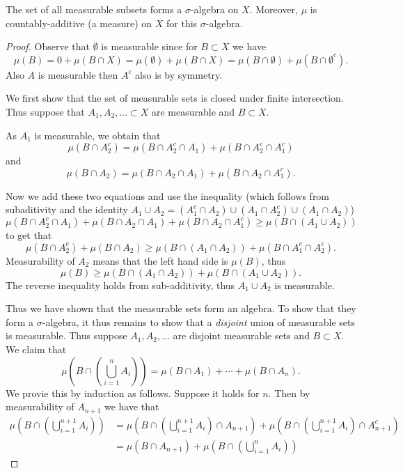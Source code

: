 \documentclass[twoside, a4paper, 10pt]{amsart}
\begin{document}
\begin{thm}\label{thm: mes sets sigma algebra} The set of all measurable subsets forms a $\sigma$-algebra on $X$. Moreover, $\mu$ is countably-additive (a measure) on $X$ for this $\sigma$-algebra.

\end{thm}

\begin{proof} Observe that $\emptyset$ is measurable since for $B \subset X$ we have $$\mu(B) = 0 + \mu(B \cap X) = \mu(\emptyset) + \mu(B \cap X) = \mu(B \cap \emptyset) + \mu(B \cap \emptyset^c).$$ Also $A$ is measurable then $A^c$ also is by symmetry.

We first show that the set of measurable sets is closed under finite intersection. Thus suppose that $A_1, A_2,\ldots \subset X$ are measurable and $B \subset X$.

As $A_1$ is measurable, we obtain that $$\mu(B \cap A_2^c) = \mu(B \cap A_2^c \cap A_1) + \mu(B \cap A_2^c \cap A_1^c)$$ and $$\mu(B \cap A_2) = \mu(B \cap A_2 \cap A_1) + \mu(B \cap A_2 \cap A_1^c).$$ 

Now we add these two equations and use the inequality (which follows from subaditivity and the identity $A_1 \cup A_2 = (A_1^c \cap A_2) \cup (A_1 \cap A_2^c) \cup (A_1 \cap A_2)$) $$\mu(B \cap A_2^c \cap A_1) + \mu(B \cap A_2 \cap A_1) + \mu(B \cap A_2 \cap A_1^c) \geq \mu(B \cap (A_1 \cup A_2))$$ to get that $$\mu(B \cap A_2^c) + \mu(B \cap A_2) \geq \mu(B \cap (A_1 \cap A_2)) + \mu(B \cap A_1^c \cap A_2^c).$$ Measurability of $A_2$ means that the left hand side is $\mu(B)$, thus $$\mu(B) \geq \mu(B \cap (A_1 \cap A_2)) + \mu(B \cap (A_1 \cup A_2)).$$ The reverse inequality holds from sub-additivity, thus $A_1 \cup A_2$ is measurable.

Thus we have shown that the measurable sets form an algebra. To show that they form a $\sigma$-algebra, it thus remains to show that a \textit{disjoint} union of measurable sets is measurable. Thus suppose $A_1, A_2, \ldots$ are disjoint measurable sets and $B \subset X$. We claim that $$\mu\left(B \cap \left(\bigcup_{i=1}^n A_i\right)\right) = \mu(B \cap A_1) + \cdots + \mu(B \cap A_n).$$ We provie this by induction as follows. Suppose it holds for $n$. Then by measurability of $A_{n+1}$ we have that 
\begin{align*}\mu\left(B \cap \left(\bigcup_{i=1}^{n+1} A_i\right)\right) &=  \mu\left(B \cap \left(\bigcup_{i=1}^{n+1} A_i\right) \cap A_{n+1}\right) + \mu\left(B \cap \left(\bigcup_{i=1}^{n+1} A_i\right) \cap A_{n+1}^c\right) 
\\ &= \mu(B \cap A_{n+1}) + \mu\left(B \cap \left(\bigcup_{i=1}^n A_i\right)\right) \end{align*}


\end{proof}
\end{document}
